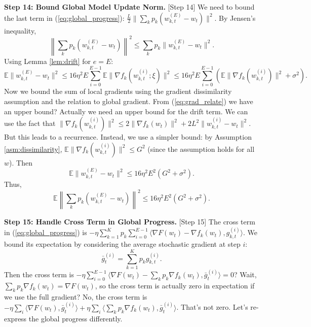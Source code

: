\documentclass{article}
\begin{document}
\textbf{Step 14: Bound Global Model Update Norm.} [Step 14] %
We need to bound the last term in (\ref{eq:global_progress}): $\frac{L}{2} \| \sum_k p_k (w_{k,t}^{(E)} - w_t) \|^2$.
By Jensen's inequality,
\begin{equation}
    \left\| \sum_k p_k (w_{k,t}^{(E)} - w_t) \right\|^2 \leq \sum_k p_k \| w_{k,t}^{(E)} - w_t \|^2.
\end{equation}
Using Lemma \ref{lem:drift} for $e=E$:
\begin{equation}
    \mathbb{E} \| w_{k,t}^{(E)} - w_t \|^2 \leq 16 \eta^2 E \sum_{i=0}^{E-1} \mathbb{E} \| \nabla f_k(w_{k,t}^{(i)}; \xi) \|^2 \leq 16 \eta^2 E \sum_{i=0}^{E-1} \left( \mathbb{E} \| \nabla f_k(w_{k,t}^{(i)}) \|^2 + \sigma^2 \right).
\end{equation}
Now we bound the sum of local gradients using the gradient dissimilarity assumption and the relation to global gradient. From (\ref{eq:grad_relate}) we have an upper bound? Actually we need an upper bound for the drift term. We can use the fact that $\| \nabla f_k(w_{k,t}^{(i)}) \|^2 \leq 2 \| \nabla f_k(w_t) \|^2 + 2 L^2 \| w_{k,t}^{(i)} - w_t \|^2$. But this leads to a recurrence. Instead, we use a simpler bound: by Assumption \ref{asm:dissimilarity}, $\mathbb{E} \| \nabla f_k(w_{k,t}^{(i)}) \|^2 \leq G^2$ (since the assumption holds for all $w$). Then
\begin{equation}
    \mathbb{E} \| w_{k,t}^{(E)} - w_t \|^2 \leq 16 \eta^2 E^2 (G^2 + \sigma^2).
\end{equation}
Thus,
\begin{equation}
    \mathbb{E} \left\| \sum_k p_k (w_{k,t}^{(E)} - w_t) \right\|^2 \leq 16 \eta^2 E^2 (G^2 + \sigma^2). \label{eq:update_norm}
\end{equation}

\textbf{Step 15: Handle Cross Term in Global Progress.} [Step 15] %
The cross term in (\ref{eq:global_progress}) is $-\eta \sum_{k=1}^K p_k \sum_{i=0}^{E-1} \langle \nabla F(w_t) - \nabla f_k(w_t), g_{k,t}^{(i)} \rangle$.
We bound its expectation by considering the average stochastic gradient at step $i$:
\begin{equation}
    \bar{g}_t^{(i)} = \sum_{k=1}^K p_k g_{k,t}^{(i)}.
\end{equation}
Then the cross term is $-\eta \sum_{i=0}^{E-1} \langle \nabla F(w_t) - \sum_k p_k \nabla f_k(w_t), \bar{g}_t^{(i)} \rangle = 0$? Wait, $\sum_k p_k \nabla f_k(w_t) = \nabla F(w_t)$, so the cross term is actually zero in expectation if we use the full gradient? No, the cross term is $-\eta \sum_i \langle \nabla F(w_t), \bar{g}_t^{(i)} \rangle + \eta \sum_i \langle \sum_k p_k \nabla f_k(w_t), \bar{g}_t^{(i)} \rangle$. That's not zero. Let's re-express the global progress differently.
\end{document}
